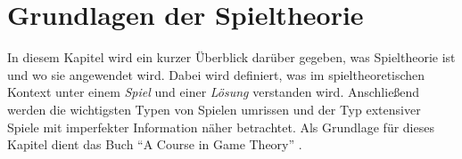 \section{Grundlagen der Spieltheorie}
In diesem Kapitel wird ein kurzer Überblick darüber gegeben, was Spieltheorie ist und wo sie angewendet wird.
Dabei wird definiert, was im spieltheoretischen Kontext unter einem \emph{Spiel} und einer \emph{Lösung} verstanden wird.
Anschließend werden die wichtigsten Typen von Spielen umrissen und der Typ extensiver Spiele mit imperfekter Information näher betrachtet.
Als Grundlage für dieses Kapitel dient das Buch \enquote{A Course in Game Theory} \cite{osborne1994course}.



